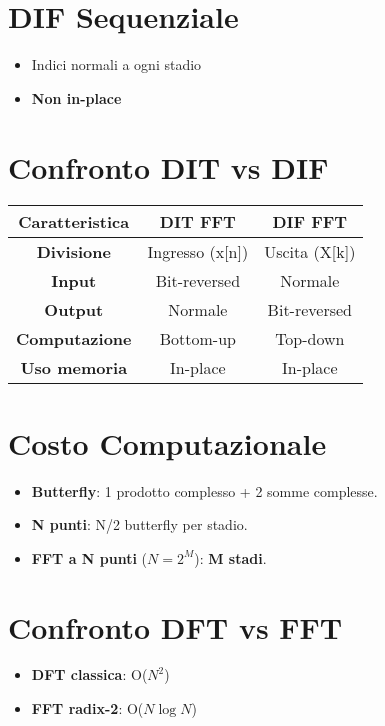 \section*{DIF Sequenziale}

\begin{itemize}
    \item Indici normali a ogni stadio
    \item \textbf{Non in-place}
\end{itemize}

\section*{Confronto DIT vs DIF}

\begin{center}
\begin{tabular}{|c|c|c|}
\hline
\textbf{Caratteristica} & \textbf{DIT FFT} & \textbf{DIF FFT} \\
\hline
\textbf{Divisione} & Ingresso (x[n]) & Uscita (X[k]) \\
\hline
\textbf{Input} & Bit-reversed & Normale \\
\hline
\textbf{Output} & Normale & Bit-reversed \\
\hline
\textbf{Computazione} & Bottom-up & Top-down \\
\hline
\textbf{Uso memoria} & In-place & In-place \\
\hline
\end{tabular}
\end{center}

\section*{Costo Computazionale}

\begin{itemize}
    \item \textbf{Butterfly}: 1 prodotto complesso + 2 somme complesse.
    \item \textbf{N punti}: N/2 butterfly per stadio.
    \item \textbf{FFT a N punti} ($N = 2^M$): \textbf{M stadi}.
\end{itemize}

\section*{Confronto DFT vs FFT}

\begin{itemize}
    \item \textbf{DFT classica}: O($N^2$)
    \item \textbf{FFT radix-2}: O($N \log N$)
\end{itemize}

